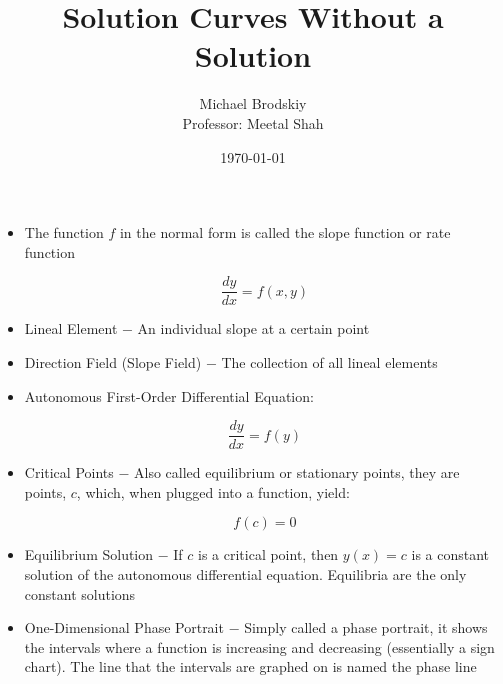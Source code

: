 \documentclass[12pt]{article}
\title{Solution Curves Without a Solution}
\date{\today}
\author{Michael Brodskiy\\ \small Professor: Meetal Shah}
\begin{document}
\maketitle

\begin{itemize}

  \item The function $f$ in the normal form is called the slope function or rate function 

    $$\frac{dy}{dx}=f(x,y)$$

  \item Lineal Element $-$ An individual slope at a certain point

  \item Direction Field (Slope Field) $-$ The collection of all lineal elements

  \item Autonomous First-Order Differential Equation:

    $$\frac{dy}{dx}=f(y)$$

  \item Critical Points $-$ Also called equilibrium or stationary points, they are points, $c$, which, when plugged into a function, yield:

    $$f(c)=0$$

  \item Equilibrium Solution $-$ If $c$ is a critical point, then $y(x)=c$ is a constant solution of the autonomous differential equation. Equilibria are the only constant solutions

  \item One-Dimensional Phase Portrait $-$ Simply called a phase portrait, it shows the intervals where a function is increasing and decreasing (essentially a sign chart). The line that the intervals are graphed on is named the phase line

\end{itemize}
\end{document}
